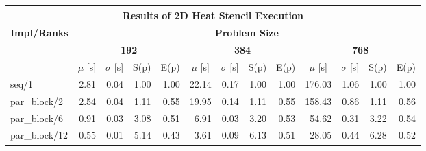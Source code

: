 \begin{table}[]
\begin{tabular}{|lllllllllllll|}
\hline
\multicolumn{13}{|c|}{\textbf{Results of 2D Heat Stencil Execution}} \\ \hline
\multicolumn{1}{|c|}{\textbf{Impl/Ranks}} & \multicolumn{12}{c|}{\textbf{Problem Size}} \\ \hline
\multicolumn{1}{|c|}{\textbf{}} & \multicolumn{4}{c|}{\textbf{192}} & \multicolumn{4}{c|}{\textbf{384}} & \multicolumn{4}{c|}{\textbf{768}} \\ \hline
\multicolumn{1}{|l|}{} & \multicolumn{1}{c|}{$\mu$ [s]} & \multicolumn{1}{c|}{$\sigma$ [s]} & \multicolumn{1}{c|}{S(p)} & \multicolumn{1}{c|}{E(p)} & \multicolumn{1}{c|}{$\mu$ [s]} & \multicolumn{1}{c|}{$\sigma$ [s]} & \multicolumn{1}{c|}{S(p)} & \multicolumn{1}{c|}{E(p)} & \multicolumn{1}{c|}{$\mu$ [s]} & \multicolumn{1}{c|}{$\sigma$ [s]} & \multicolumn{1}{c|}{S(p)} & \multicolumn{1}{c|}{E(p)} \\ \hline
\multicolumn{1}{|l|}{seq/1}  & \multicolumn{1}{r|}{2.81} & \multicolumn{1}{r|}{0.04} & \multicolumn{1}{r|}{1.00} & \multicolumn{1}{r|}{1.00}  & \multicolumn{1}{r|}{22.14} & \multicolumn{1}{r|}{0.17} & \multicolumn{1}{r|}{1.00} & \multicolumn{1}{r|}{1.00}  & \multicolumn{1}{r|}{176.03} & \multicolumn{1}{r|}{1.06} & \multicolumn{1}{r|}{1.00} & \multicolumn{1}{r|}{1.00}  \\ \hline
\multicolumn{1}{|l|}{par\_block/2}  & \multicolumn{1}{r|}{2.54} & \multicolumn{1}{r|}{0.04} & \multicolumn{1}{r|}{1.11} & \multicolumn{1}{r|}{0.55}  & \multicolumn{1}{r|}{19.95} & \multicolumn{1}{r|}{0.14} & \multicolumn{1}{r|}{1.11} & \multicolumn{1}{r|}{0.55}  & \multicolumn{1}{r|}{158.43} & \multicolumn{1}{r|}{0.86} & \multicolumn{1}{r|}{1.11} & \multicolumn{1}{r|}{0.56}  \\ \hline
\multicolumn{1}{|l|}{par\_block/6}  & \multicolumn{1}{r|}{0.91} & \multicolumn{1}{r|}{0.03} & \multicolumn{1}{r|}{3.08} & \multicolumn{1}{r|}{0.51}  & \multicolumn{1}{r|}{6.91} & \multicolumn{1}{r|}{0.03} & \multicolumn{1}{r|}{3.20} & \multicolumn{1}{r|}{0.53}  & \multicolumn{1}{r|}{54.62} & \multicolumn{1}{r|}{0.31} & \multicolumn{1}{r|}{3.22} & \multicolumn{1}{r|}{0.54}  \\ \hline
\multicolumn{1}{|l|}{par\_block/12}  & \multicolumn{1}{r|}{0.55} & \multicolumn{1}{r|}{0.01} & \multicolumn{1}{r|}{5.14} & \multicolumn{1}{r|}{0.43}  & \multicolumn{1}{r|}{3.61} & \multicolumn{1}{r|}{0.09} & \multicolumn{1}{r|}{6.13} & \multicolumn{1}{r|}{0.51}  & \multicolumn{1}{r|}{28.05} & \multicolumn{1}{r|}{0.44} & \multicolumn{1}{r|}{6.28} & \multicolumn{1}{r|}{0.52}  \\ \hline

\end{tabular}
\end{table}
